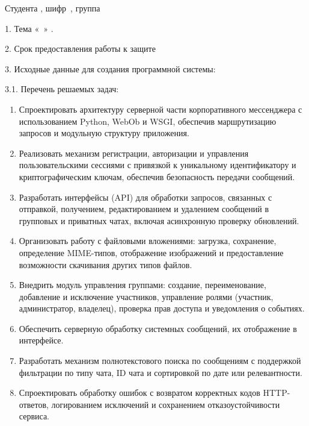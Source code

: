 {\parindent0pt
  Студента , шифр\ , группа 
  
1. Тема «\ »
\fi.

2. Срок предоставления работы к защите 

3. Исходные данные для создания программной системы:

3.1. Перечень решаемых задач:

\begin{enumerate}
	\item Спроектировать архитектуру серверной части корпоративного мессенджера с использованием Python, WebOb и WSGI, обеспечив маршрутизацию запросов и модульную структуру приложения.
	
	\item Реализовать механизм регистрации, авторизации и управления пользовательскими сессиями с привязкой к уникальному идентификатору и криптографическим ключам, обеспечив безопасность передачи сообщений.
	
	\item Разработать интерфейсы (API) для обработки запросов, связанных с отправкой, получением, редактированием и удалением сообщений в групповых и приватных чатах, включая асинхронную проверку обновлений.
	
	\item Организовать работу с файловыми вложениями: загрузка, сохранение, определение MIME-типов, отображение изображений и предоставление возможности скачивания других типов файлов.
	
	\item Внедрить модуль управления группами: создание, переименование, добавление и исключение участников, управление ролями (участник, администратор, владелец), проверка прав доступа и уведомления о событиях.
	
	\item Обеспечить серверную обработку системных сообщений, их отображение в интерфейсе.
	
	\item Разработать механизм полнотекстового поиска по сообщениям с поддержкой фильтрации по типу чата, ID чата и сортировкой по дате или релевантности.
	
	\item Спроектировать обработку ошибок с возвратом корректных кодов HTTP-ответов, логированием исключений и сохранением отказоустойчивости сервиса.
	

\end{enumerate}}
